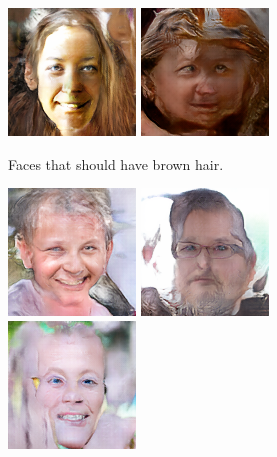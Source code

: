 \begin{figure}[!h]
\begin{subfigure}[b]{\textwidth}
{            \includegraphics[scale=0.485]{figures/ffhq/forced-hair-brown/ffhq128x128_hair_color_brown0004.png}
            \includegraphics[scale=0.485]{figures/ffhq/forced-hair-brown/ffhq128x128_hair_color_brown0005.png}
        }
        \caption{Faces that should have brown hair.}
        \vspace{0.1cm}
    \end{subfigure}
    \begin{subfigure}[b]{\textwidth}
        \centerline{
            \includegraphics[scale=0.485]{figures/ffhq/forced-hair-gray/ffhq128x128_hair_color_gray0000.png}
            \includegraphics[scale=0.485]{figures/ffhq/forced-hair-gray/ffhq128x128_hair_color_gray0001.png}
            \includegraphics[scale=0.485]{figures/ffhq/forced-hair-gray/ffhq128x128_hair_color_gray0002.png}
}
\end{subfigure}
\end{figure}
